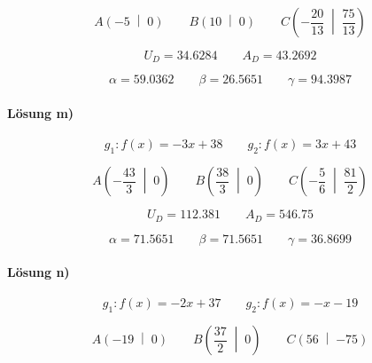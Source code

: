 \begin{equation*}
  A\left(\num{-5}\;\middle|\;\num{0}\right)
  \qquad
  B\left(\num{10}\;\middle|\;\num{0}\right)
  \qquad
  C\left(-\frac{\num{20}}{\num{13}}\;\middle|\;\frac{\num{75}}{\num{13}}\right)
\end{equation*}

\begin{equation*}
  U_D=\num{34.6284}
  \qquad
  A_D=\num{43.2692}
\end{equation*}

\begin{equation*}
  \alpha=\num{59.0362}
  \qquad
  \beta=\num{26.5651}
  \qquad
  \gamma=\num{94.3987}
\end{equation*}

\paragraph{Lösung m)}
\begin{equation*}
  g_1:f(x)=-\num{3}x+\num{38}
  \qquad
  g_2:f(x)=\num{3}x+\num{43}
\end{equation*}

\begin{equation*}
  A\left(-\frac{\num{43}}{\num{3}}\;\middle|\;\num{0}\right)
  \qquad
  B\left(\frac{\num{38}}{\num{3}}\;\middle|\;\num{0}\right)
  \qquad
  C\left(-\frac{\num{5}}{\num{6}}\;\middle|\;\frac{\num{81}}{\num{2}}\right)
\end{equation*}

\begin{equation*}
  U_D=\num{112.381}
  \qquad
  A_D=\num{546.75}
\end{equation*}

\begin{equation*}
  \alpha=\num{71.5651}
  \qquad
  \beta=\num{71.5651}
  \qquad
  \gamma=\num{36.8699}
\end{equation*}

\paragraph{Lösung n)}
\begin{equation*}
  g_1:f(x)=-\num{2}x+\num{37}
  \qquad
  g_2:f(x)=-x-\num{19}
\end{equation*}

\begin{equation*}
  A\left(\num{-19}\;\middle|\;\num{0}\right)
  \qquad
  B\left(\frac{\num{37}}{\num{2}}\;\middle|\;\num{0}\right)
  \qquad
  C\left(\num{56}\;\middle|\;\num{-75}\right)
\end{equation*}

